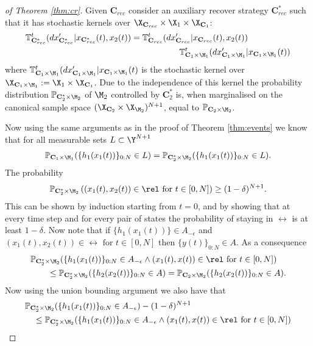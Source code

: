\documentclass[letterpaper, 10 pt, conference]{amsart}
\theoremstyle{definition}
\theoremstyle{example}
\theoremstyle{remark}
\newcommand{\eps}{\epsilon}
\newcommand{\C}{{\mathbf{C}}}
\begin{document}
\begin{proof}[of Theorem \ref{thm:cr}]
Given $\C_{rec}$ consider an auxiliary recover strategy $\C_{rec}^\ast$ such that it has stochastic kernels over $\X_{\C_{rec}}\times \X_1\times \X_{\C_1}$:
\begin{align*}\mathbb T^t_{\C_{rec}^\ast} (dx_{\C_{rec}^\ast}'{\mid}x_{\C_{rec}^\ast}(t),x_2(t) )&=\mathbb T^t_{\C_{rec}} (dx_{\C_{rec}}'{\mid}x_{\C_{rec}}(t),x_2(t) )\\&\hspace{2cm }\mathbb T^t_{\C_{1}\times \M_1} (dx_{\C_{1}\times \M_1}'{\mid}x_{\C_{1}\times \M_1}(t)) \end{align*}
where $\mathbb T^t_{\C_{1}\times \M_1} (dx_{\C_{1}\times \M_1}'{\mid}x_{\C_{1}\times \M_1}(t)$ is the stochastic kernel over   $\X_{\C_1\times \M_1}:=\X_1\times \X_{\C_1}$.
Due to the independence of this kernel the probability distribution $\mathbb P_{\C_2^\ast\times \M_2}$ of $\M_2$ controlled by $\C_2^\ast$ is, when marginalised on the canonical sample space $(\X_{\C_2}\times \X_{\M_2})^{N+1}$, equal to $\mathbb P_{\C_2\times \M_2}$.

Now using the same arguments as in the proof of Theorem \ref{thm:events} we know that for all measurable sets $L\subset \Y^{N+1}$
\begin{align*}
\mathbb P_{\C_1\times \M_1}(\{h_1(x_1(t))\}_{0:N}\in L)=\mathbb P_{\C_2^\ast\times \M_2}(\{h_1(x_1(t))\}_{0:N}\in L).
\end{align*}
The probability 
\[\mathbb P_{\C_2^\ast\times \M_2}\left((x_1(t),x_2(t))\in \rel \mbox{ for } t\in[0,N]\right)\geq (1-\delta)^{N+1}.
\]
This can be shown by induction starting from $t=0$, and by showing that at every time step and for every pair of states the probability of staying in $\rel$ is at least $1-\delta$.
Now note that if $\{h_1(x_1(t))\}\in A_{-\eps}$ and $(x_1(t),x_2(t))\in \rel \mbox{ for } t\in[0,N]$ then $\{y(t)\}_{0:N}\in A$.
As a consequence
\begin{align*}
 &\mathbb P_{\C_2^\ast\times \M_2}(\{h_1(x_1(t))\}_{0:N}\in A_{-\eps}\wedge (x_1(t),x(t))\in \rel \mbox{ for } t\in [0,N] )\\&\qquad\leq  \mathbb P_{\C_2^\ast\times \M_2}(\{h_2(x_2(t))\}_{0:N}\in A)= \mathbb P_{\C_2\times \M_2}(\{h_2(x_2(t))\}_{0:N}\in A). 
\end{align*}
Now using the union bounding argument we also have that
\begin{align*}
&\mathbb P_{\C_2^\ast\times \M_2}(\{h_1(x_1(t))\}_{0:N}\in A_{-\eps})-(1-\delta)^{N+1}\\
&\quad\leq
\mathbb P_{\C_2^\ast\times \M_2}(\{h_1(x_1(t))\}_{0:N}\in A_{-\eps}\wedge (x_1(t),x(t))\in \rel \mbox{ for } t\in [0,N] )
\end{align*}


\end{proof}
\end{document}
